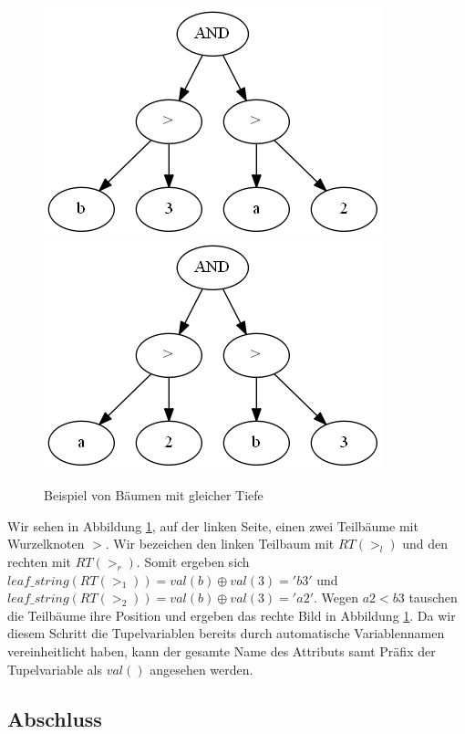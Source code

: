 \begin{figure}[h]
\includegraphics[scale=0.5]{Bilder/same_depth1.png}         \includegraphics[scale=0.5]{Bilder/same_depth2.png}
\caption{Beispiel von Bäumen mit gleicher Tiefe}
\label{fig:bsp1}
\end{figure}

Wir sehen in Abbildung \ref{fig:bsp1}, auf der linken Seite, einen zwei Teilbäume mit Wurzelknoten $>$. Wir bezeichen den linken Teilbaum mit $RT(>_l)$ und den rechten mit $RT(>_r)$. Somit ergeben sich $\mathit{leaf\_string}(RT(>_1)) = \mathit{val}(b) \oplus  \mathit{val}(3) = 'b3'$ und 
$\mathit{leaf\_string}(RT(>_2)) = \mathit{val}(b) \oplus  \mathit{val}(3) = 'a2'$. Wegen $\mathit{a2} < \mathit{b3}$ tauschen die Teilbäume ihre Position und ergeben das rechte Bild in Abbildung \ref{fig:bsp1}. Da wir diesem Schritt die Tupelvariablen bereits durch automatische Variablennamen vereinheitlicht haben, kann der gesamte Name des Attributs samt Präfix der Tupelvariable als $\mathit{val()}$ angesehen werden.

\subsection{Abschluss}

